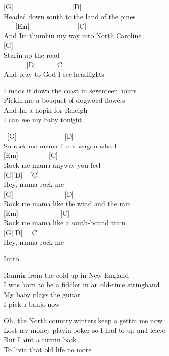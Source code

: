 \documentclass[
  letterpaper,
]{scrbook}
\begin{document}
{[}G{]} ~ ~ ~ ~ ~ ~ ~ ~ ~ ~ {[}D{]}\\
Headed down south to the land of the pines\\
\hspace*{0.333em} ~ ~ {[}Em{]} ~ ~ ~ ~ ~ ~ ~ ~ {[}C{]}\\
And I\textquotesingle m thumbin\textquotesingle{} my way into North
Caroline\\
{[}G{]}\\
Starin\textquotesingle{} up the road\\
\hspace*{0.333em} ~ ~ ~ ~ {[}D{]} ~ ~ ~ {[}C{]}\\
And pray to God I see headlights

I made it down the coast in seventeen hours\\
Pickin\textquotesingle{} me a bouquet of dogwood flowers\\
And I\textquotesingle m a hopin\textquotesingle{} for Raleigh\\
I can see my baby tonight

~{[}G{]} ~ ~ ~ ~ ~ ~ ~ ~ {[}D{]}\\
So rock me mama like a wagon wheel\\
{[}Em{]} ~ ~ ~ ~ ~ {[}C{]}\\
Rock me mama anyway you feel\\
{[}G{]}{[}D{]} ~ {[}C{]}\\
Hey, mama rock me\\
{[}G{]} ~ ~ ~ ~ ~ ~ ~ ~ ~{[}D{]}\\
Rock me mama like the wind and the rain\\
{[}Em{]} ~ ~ ~ ~ ~ ~ ~ {[}C{]}\\
Rock me mama like a south-bound train\\
{[}G{]}{[}D{]} ~ {[}C{]}\\
Hey, mama rock me

Intro

Runnin\textquotesingle{} from the cold up in New England\\
I was born to be a fiddler in an old-time stringband\\
My baby plays the guitar\\
I pick a banjo now

Oh, the North country winters keep a gettin\textquotesingle{} me now\\
Lost my money playin\textquotesingle{} poker so I had to up and leave\\
But I ain\textquotesingle t a turnin\textquotesingle{} back\\
To livin\textquotesingle{} that old life no more
\end{document}
